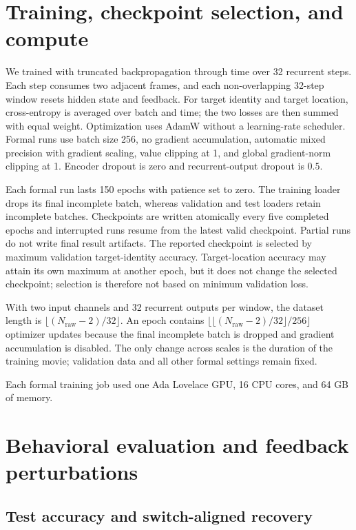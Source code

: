 \section{Training, checkpoint selection, and compute}
\label{app:training}

We trained with truncated backpropagation through time over 32 recurrent steps. Each step consumes two adjacent frames, and each non-overlapping 32-step window resets hidden state and feedback. For target identity and target location, cross-entropy is averaged over batch and time; the two losses are then summed with equal weight. Optimization uses AdamW without a learning-rate scheduler. Formal runs use batch size 256, no gradient accumulation, automatic mixed precision with gradient scaling, value clipping at 1, and global gradient-norm clipping at 1. Encoder dropout is zero and recurrent-output dropout is \(0.5\).

Each formal run lasts 150 epochs with patience set to zero. The training loader drops its final incomplete batch, whereas validation and test loaders retain incomplete batches. Checkpoints are written atomically every five completed epochs and interrupted runs resume from the latest valid checkpoint. Partial runs do not write final result artifacts. The reported checkpoint is selected by maximum validation target-identity accuracy. Target-location accuracy may attain its own maximum at another epoch, but it does not change the selected checkpoint; selection is therefore not based on minimum validation loss.

With two input channels and 32 recurrent outputs per window, the dataset length is \(\lfloor(N_{\mathrm{raw}}-2)/32\rfloor\). An epoch contains \(\lfloor\lfloor(N_{\mathrm{raw}}-2)/32\rfloor/256\rfloor\) optimizer updates because the final incomplete batch is dropped and gradient accumulation is disabled. The only change across scales is the duration of the training movie; validation data and all other formal settings remain fixed.

Each formal training job used one Ada Lovelace GPU, 16 CPU cores, and 64 GB of memory.

\section{Behavioral evaluation and feedback perturbations}
\label{app:behavior}

\subsection{Test accuracy and switch-aligned recovery}

